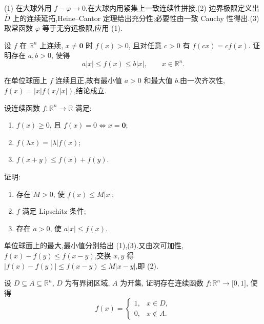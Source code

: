 \begin{solution}

    (1) 在大球外用 $f-\varphi\to0$,在大球内用紧集上一致连续性拼接.(2) 边界极限定义出 $\overline D$ 上的连续延拓,Heine--Cantor 定理给出充分性;必要性由一致 Cauchy 性得出.(3) 取常函数 $\varphi$ 等于无穷远极限,应用 (1).
\end{solution}

\begin{example}[\markstar]
    设 $f$ 在 $\mathbb{R}^n$ 上连续, $x\ne\bm{0}$ 时 $f(x)>0$, 且对任意 $c>0$ 有 $f(cx)=cf(x)$. 证明存在 $a,b>0$, 使得
    \[
        a|x|\leq f(x)\leq b|x|,
        \qquad x\in\mathbb{R}^n.
    \]
\end{example}
\exampleblank

\begin{solution}
    在单位球面上 $f$ 连续且正,故有最小值 $a>0$ 和最大值 $b$.由一次齐次性,$f(x)=|x|f(x/|x|)$,结论成立.
\end{solution}

\begin{example}[\markstar]
    设连续函数 $f:\mathbb{R}^n\to\mathbb{R}$ 满足:
    \begin{enumerate}[label=(\roman*)]
        \item $f(x)\geq0$, 且 $f(x)=0\iff x=\bm{0}$;
        \item $f(\lambda x)=|\lambda|f(x)$;
        \item $f(x+y)\leq f(x)+f(y)$.
    \end{enumerate}
    证明:
    \begin{enumerate}
        \item 存在 $M>0$, 使 $f(x)\leq M|x|$;
        \item $f$ 满足 Lipschitz 条件;
        \item 存在 $a>0$, 使 $a|x|\leq f(x)$.
    \end{enumerate}
\end{example}
\exampleblank

\begin{solution}
    单位球面上的最大,最小值分别给出 (1),(3).又由次可加性,$f(x)-f(y)\leq f(x-y)$,交换 $x,y$ 得 $|f(x)-f(y)|\leq f(x-y)\leq M|x-y|$,即 (2).
\end{solution}

\begin{example}
    设 $D\subseteq A\subseteq\mathbb{R}^n$, $D$ 为有界闭区域, $A$ 为开集, 证明存在连续函数 $f:\mathbb{R}^n\to\lbrack0,1\rbrack$, 使得
    \[
        f(x)=
        \begin{cases}
            1, & x\in D,    \\
            0, & x\notin A.
        \end{cases}
    \]
\end{example}
\exampleblank

